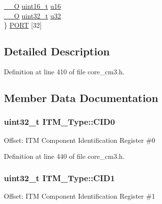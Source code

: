 \begin{DoxyCompactItemize}
\begin{tabbing}
\>\hyperlink{group___c_m_s_i_s___c_m3__core__definitions_ga7e25d9380f9ef903923964322e71f2f6}{\_\_O} \hyperlink{_p_e___types_8h_a1f1825b69244eb3ad2c7165ddc99c956}{uint16\_t} \hyperlink{struct_i_t_m___type_a12aa4eb4d9dcb589a5d953c836f4e8f4}{u16}\\
\>\hyperlink{group___c_m_s_i_s___c_m3__core__definitions_ga7e25d9380f9ef903923964322e71f2f6}{\_\_O} \hyperlink{_p_e___types_8h_a33594304e786b158f3fb30289278f5af}{uint32\_t} \hyperlink{struct_i_t_m___type_a6882fa5af67ef5c5dfb433b3b68939df}{u32}\\
\} \hyperlink{struct_i_t_m___type_ab1afbd0238eb66b5da3397b943e2669b}{PORT} \mbox{[}32\mbox{]}\\

\end{tabbing}\end{DoxyCompactItemize}


\subsection{Detailed Description}


Definition at line 410 of file core\+\_\+cm3.\+h.



\subsection{Member Data Documentation}
\subsubsection[{\texorpdfstring{C\+I\+D0}{CID0}}]{ {\bf uint32\+\_\+t} I\+T\+M\+\_\+\+Type\+::\+C\+I\+D0}\hypertarget{struct_i_t_m___type_a413f3bb0a15222e5f38fca4baeef14f6}{}\label{struct_i_t_m___type_a413f3bb0a15222e5f38fca4baeef14f6}
Offset\+: I\+TM Component Identification Register \#0 

Definition at line 440 of file core\+\_\+cm3.\+h.

\subsubsection[{\texorpdfstring{C\+I\+D1}{CID1}}]{ {\bf uint32\+\_\+t} I\+T\+M\+\_\+\+Type\+::\+C\+I\+D1}\hypertarget{struct_i_t_m___type_a5f7d524b71f49e444ff0d1d52b3c3565}{}\label{struct_i_t_m___type_a5f7d524b71f49e444ff0d1d52b3c3565}
Offset\+: I\+TM Component Identification Register \#1 

